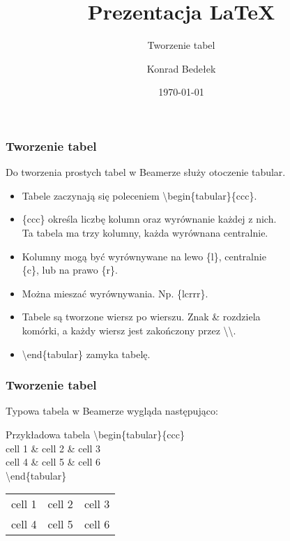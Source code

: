 \documentclass{beamer}%
\title{Prezentacja \LaTeX}
\subtitle{Tworzenie tabel}
\author{Konrad Bedełek}
\institute{Wydział Mechatroniki\\ Politechnika Warszawska}
\date{\today}
\begin{document}
\begin{frame}
\titlepage
\end{frame}

\begin{frame}

\frametitle{Tworzenie tabel}

Do tworzenia prostych tabel w Beamerze służy otoczenie tabular.
\begin{itemize}[<+->]%
\item Tabele zaczynają się poleceniem \textbackslash begin\{tabular\}\{ccc\}.
\item \{ccc\} określa liczbę kolumn oraz wyrównanie każdej z nich.\\
Ta tabela ma trzy kolumny, każda wyrównana centralnie.
\item Kolumny mogą być wyrównywane na lewo \{l\}, centralnie\\
\{c\}, lub na prawo \{r\}.
\item Można mieszać wyrównywania. Np. \{lcrrr\}.
\item Tabele są tworzone wiersz po wierszu. Znak \& rozdziela\\
komórki, a każdy wiersz jest zakończony przez \textbackslash\textbackslash.
\item \textbackslash end\{tabular\} zamyka tabelę.

\end{itemize}
\end{frame}

\begin{frame}
\frametitle{Tworzenie tabel}
Typowa tabela w Beamerze wygląda następująco:

\begin{block}{Przykładowa tabela}%
\textbackslash begin\{tabular\}\{ccc\}\\
cell 1 \& cell 2 \& cell 3 \\
cell 4 \& cell 5 \& cell 6 \\
\textbackslash end\{tabular\}

\end{block}
\pause%
\begin{tabular}{ccc}
cell 1 & cell 2 & cell 3 \\
cell 4 & cell 5 & cell 6 \\
\end{tabular}

\end{frame}
\end{document}
